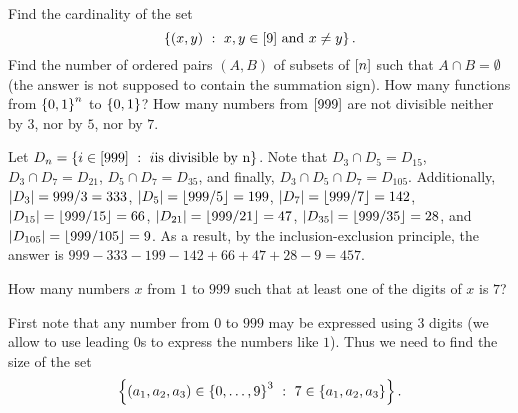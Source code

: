 \begin{chapterendexercises}
  \exercise
    Find the cardinality of the set
    \[
      \set[{x, y \in \range{9} \text{ and } x \neq y}]{(x, y)}.
    \]
  \exercise[recommended] Find the number of ordered pairs $(A, B)$ of subsets of
    ${[{n}]}$ such that $A \cap B = \emptyset$ (the answer is not supposed to
    contain the summation sign).
  \exercise How many functions from $\set{0, 1}^n$ to $\set{0, 1}$?
  \exercise[recommended] How many numbers from ${[{999}]}$ are not divisible
    neither by $3$, nor by $5$, nor by $7$.
    \begin{solution}
      Let $D_n = \set[i \text{is divisible by n}]{i \in \range{999}}$.
      Note that $D_3 \cap D_5 = D_{15}$, $D_3 \cap D_7 = D_{21}$, $D_5 \cap D_7
      = D_{35}$, and finally, $D_3 \cap D_5 \cap D_7 = D_{105}$. Additionally,
      $\left|{D_3}\right| = 999 / 3 = 333$,
      $\left|{D_5}\right| = \left\lfloor {999 / 5} \right\rfloor = 199$,
      $\left|{D_7}\right| = \left\lfloor {999 / 7} \right\rfloor = 142$,
      $\left|{D_{15}}\right| = \left\lfloor {999 / 15} \right\rfloor = 66$,
      $\left|{D_{21}}\right| = \left\lfloor {999 / 21} \right\rfloor = 47$,
      $\left|{D_{35}}\right| = \left\lfloor {999 / 35} \right\rfloor = 28$, and
      $\left|{D_{105}}\right| = \left\lfloor {999 / 105} \right\rfloor = 9$.
      As a result, by the inclusion-exclusion principle, the answer is
      $999 - 333 - 199 - 142 + 66 + 47 + 28 - 9 = 457$.
    \end{solution}
  \exercise How many numbers $x$ from $1$ to $999$ such that at least one
    of the digits of $x$ is $7$?
    \begin{solution}
      First note that any number from $0$ to $999$ may be expressed using $3$
      digits (we allow to use leading $0$s to express the numbers like $1$).
      Thus we need to find the size of the set
      \[
        \set[{ 
          7 \in \{a_1, a_2, a_3\}
        }]{(a_1, a_2, a_3) \in \set{0, \dots, 9}^3}.
      \]


\end{solution}
\end{chapterendexercises}
